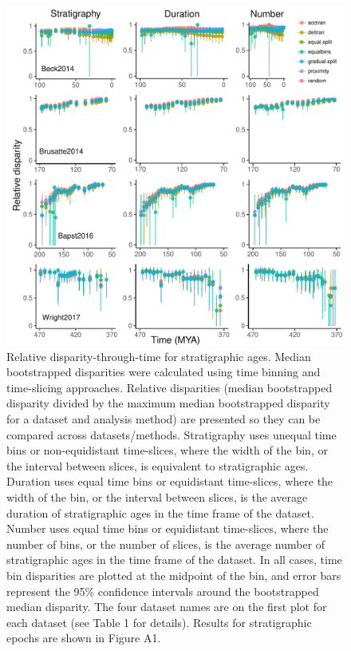 \documentclass[12pt,a4paper]{article}
\begin{document}
  \begin{figure}[!htbp]
    \centering
    \includegraphics[width=1\linewidth, height=1\textheight, keepaspectratio]{figures/fig-dtt-age-appendix.pdf}
    \caption[Relative disparity through time for four example datasets.]
    {Relative disparity-through-time for stratigraphic ages. 
    Median bootstrapped disparities were calculated using time binning and time-slicing approaches. 
    Relative disparities (median bootstrapped disparity divided by the maximum median bootstrapped disparity for a dataset and analysis method) are presented so they can be compared across datasets/methods. 
    Stratigraphy uses unequal time bins or non-equidistant time-slices, where the width of the bin, or the interval between slices, is equivalent to stratigraphic ages. 
    Duration uses equal time bins or equidistant time-slices, where the width of the bin, or the interval between slices, is the average duration of stratigraphic ages in the time frame of the dataset. 
    Number uses equal time bins or equidistant time-slices, where the number of bins, or the number of slices, is the average number of stratigraphic ages in the time frame of the dataset. 
    In all cases, time bin disparities are plotted at the midpoint of the bin, and error bars represent the 95\% confidence intervals around the bootstrapped median disparity.
    The four dataset names are on the first plot for each dataset (see Table 1 for details).
    Results for stratigraphic epochs are shown in Figure A1.}
    \label{figure:dtt3}
  \end{figure}  
\end{document}
